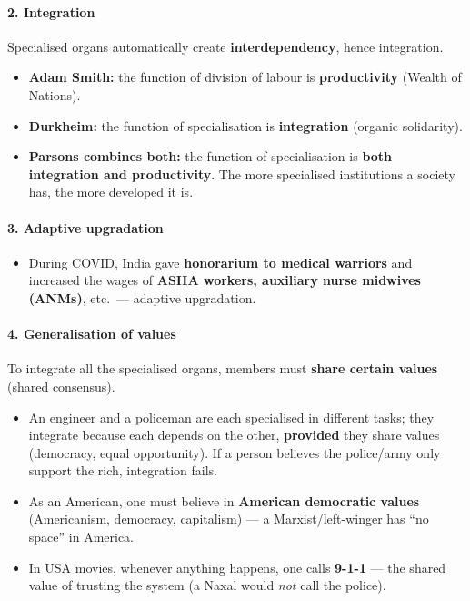\paragraph{2. Integration}
Specialised organs automatically create \textbf{interdependency}, hence integration.

\begin{KeyConcept}
\begin{itemize}
\item \textbf{Adam Smith:} the function of division of labour is \textbf{productivity} (Wealth of Nations).
\item \textbf{Durkheim:} the function of specialisation is \textbf{integration} (organic solidarity).
\item \textbf{Parsons combines both:} the function of specialisation is \textbf{both integration and productivity}. The more specialised institutions a society has, the more developed it is.
\end{itemize}
\end{KeyConcept}

\paragraph{3. Adaptive upgradation}

\begin{ExampleBox}
\begin{itemize}
\item During COVID, India gave \textbf{honorarium to medical warriors} and increased the wages of \textbf{ASHA workers, auxiliary nurse midwives (ANMs)}, etc.\ --- adaptive upgradation.
\end{itemize}
\end{ExampleBox}

\paragraph{4. Generalisation of values}
To integrate all the specialised organs, members must \textbf{share certain values} (shared consensus).

\begin{ExampleBox}
\begin{itemize}
\item An engineer and a policeman are each specialised in different tasks; they integrate because each depends on the other, \textbf{provided} they share values (democracy, equal opportunity). If a person believes the police/army only support the rich, integration fails.
\item As an American, one must believe in \textbf{American democratic values} (Americanism, democracy, capitalism) --- a Marxist/left-winger has ``no space'' in America.
\item In USA movies, whenever anything happens, one calls \textbf{9-1-1} --- the shared value of trusting the system (a Naxal would \textit{not} call the police).
\end{itemize}
\end{ExampleBox}

